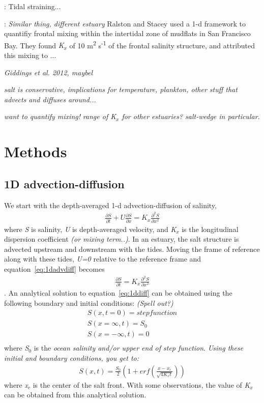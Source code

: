 \parencite{Simpson:1990aa}: Tidal straining... 

\parencite{Ralston:2005aa}: \emph{Similar thing, different estuary}
Ralston and Stacey \cite{Ralston:2005aa} used a 1-d framework to quantifiy frontal mixing within the intertidal zone of mudflats in San Francisco Bay. They found \emph{K$_x$} of 10 m\textsuperscript{2} s\textsuperscript{-1} of the frontal salinity structure, and attributed this mixing to ...

\emph{Giddings et al. 2012, maybel } 


\emph{salt is conservative, implications for temperature, plankton, other stuff that advects and diffuses around...}

\emph{want to quantify mixing!}
\emph{range of K$_x$ for other estuaries? salt-wedge in particular. }

\section{Methods} \label{sec:ch4methods}

\subsection{1D advection-diffusion} \label{ssec:1dadvdif}

We start with the depth-averaged 1-d advection-diffusion of salinity,
\begin{eqnarray}
\frac{\partial S}{\partial t} + U\frac{\partial S}{\partial x} = K_x\frac{\partial^2S}{\partial x^2} \label{eq:1dadvdiff}
\end{eqnarray}
where \emph{S} is salinity, \emph{U} is depth-averaged velocity, and \emph{K$_x$} is the longitudinal dispersion coefficient \emph{(or mixing term..)}. In an estuary, the salt structure is advected upstream and downstream with the tides. Moving the frame of reference along with these tides, \emph{U=0} relative to the reference frame and equation~\ref{eq:1dadvdiff} becomes
\begin{eqnarray}
\frac{\partial S}{\partial t} = K_x\frac{\partial^2S}{\partial x^2} \label{eq:1ddiff}
\end{eqnarray}
. An analytical solution to equation~\ref{eq:1ddiff} can be obtained using the following boundary and initial conditions: \emph{(Spell out?)}
\begin{eqnarray}
S(x,t=0) = step function\label{eq:1ddiffIC}\\
S(x=\infty,t) = S_0\label{eq:1ddiffBC1}\\
S(x=-\infty,t) = 0\label{eq:1ddiffBC2}\\
\end{eqnarray}
where \emph{S$_0$} is the \emph{ocean salinity and/or upper end of step function}. \emph{Using these initial and boundary conditions, you get to:}
\begin{eqnarray}
S(x,t) = \frac{S_0}{2}\left(1+erf\left(\frac{x-x_c}{\sqrt{4K_xt}}\right)\right) \label{eq:S}
\end{eqnarray}
where \emph{x$_c$} is the center of the salt front. With some observations, the value of \emph{K$_x$} can be obtained from this analytical solution.


